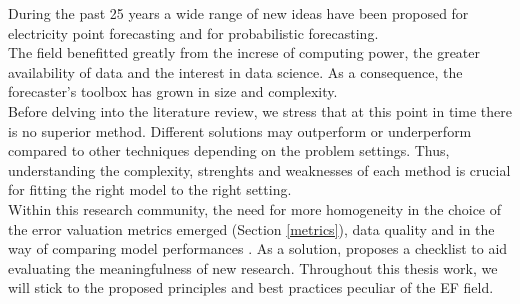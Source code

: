 During the past 25 years %
a wide range of new ideas have been proposed for electricity point forecasting and for probabilistic forecasting.
\\
The field benefitted greatly from the increse of computing power, the greater availability of data and the interest in data science.
As a consequence, the forecaster's toolbox has grown in size and complexity.
\\
Before delving into the literature review, we stress that at this point in time there is no superior method. Different solutions may outperform or underperform compared to other techniques depending on the problem settings. Thus, understanding the complexity, strenghts and weaknesses of each method is crucial for fitting the right model to the right setting.
\\
Within this research community, the need for more homogeneity in the choice of the error valuation metrics emerged (Section \ref{metrics}), data quality and in the way of comparing model performances \cite{EPF_review}. As a solution, \cite{lago} proposes a checklist to aid evaluating the meaningfulness of new research. Throughout this thesis work, we will stick to the proposed principles and best practices peculiar of the EF field.

